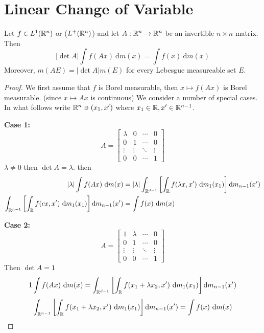 \section{Linear Change of Variable}
\begin{theorem}
  Let $f \in L^1(\mathbb R^n)$ or ($L^+(\mathbb R^n)$) and let $A: \mathbb R^n \to \mathbb R^n$ be an invertible $n \times n$ matrix. Then 
  \[|\det A| \int f(Ax) \ \mathrm{d}m(x) = \int f(x) \ \mathrm{d}m(x)\]
  Moreover, $m(AE) = |\det A| m(E)$
  for every Lebesgue measureable set $E$.
\end{theorem}
\begin{proof}
  We first assume that $f$ is Borel measurable, then $x \mapsto f(Ax)$ is Borel measurable.
  (since $x \mapsto Ax$ is continuous) We consider a number of special cases.
  In what follows write $\mathbb R^n \ni (x_1, x')$ where $x_1 \in \mathbb R, x' \in \mathbb R^{n-1}$.

  \textbf{Case 1:}
  \[ A = \begin{bmatrix}
    \lambda & 0 & \dotsm & 0 \\
    0 & 1 & \dotsm & 0 \\
    \vdots & \vdots & \ddots & \vdots \\
    0 & 0 & \dotsm & 1
  \end{bmatrix}\]
  $\lambda  \neq 0$ then $\det A = \lambda$. then 
  \begin{align*}
    |\lambda| \int f(Ax)\ \mathrm{d}m(x) &= |\lambda|\int_{\RR^{d-1}} \left[\int_\RR f(\lambda x, x') \ \mathrm{d}m_1(x_1)\right]\mathrm{d}m_{n-1}(x') \\
    \int_{\RR^{n-1}} \left[\int_\RR f(cx, x') \ \mathrm{d}m_1(x_1)\right]\mathrm{d}m_{n-1}(x') &= \int f(x) \ \mathrm{d}m(x) 
  \end{align*}

  \textbf{Case 2:}
  \[A = \begin{bmatrix}
    1 & \lambda  & \dotsm & 0\\
    0 & 1   & \dotsm & 0\\
    \vdots & \vdots & \ddots & \vdots \\
    0 & 0  & \dotsm & 1
  \end{bmatrix}\]
  Then $\det A = 1$ 
  \[1 \int f(Ax) \ \mathrm{d}m(x) = \int_{\RR^{d-1}}\left[\int_\RR f(x_1 + \lambda x_2, x')\ \mathrm{d}m_1(x_1)\right] \mathrm{d}m_{n-1}(x') \]
  \[\int_{\RR^{n-1}}\left[\int_\RR f(x_1 + \lambda x_2, x')\ \mathrm{d}m_1(x_1)\right] \mathrm{d}m_{n-1}(x') = \int f(x) \ \mathrm{d}m(x)\]


\end{proof}
